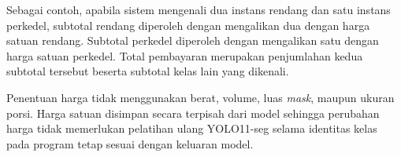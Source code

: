 Sebagai contoh, apabila sistem mengenali dua instans rendang dan satu instans perkedel, subtotal rendang diperoleh dengan mengalikan dua dengan harga satuan rendang. Subtotal perkedel diperoleh dengan mengalikan satu dengan harga satuan perkedel. Total pembayaran merupakan penjumlahan kedua subtotal tersebut beserta subtotal kelas lain yang dikenali.

Penentuan harga tidak menggunakan berat, volume, luas \textit{mask}, maupun ukuran porsi. Harga satuan disimpan secara terpisah dari model sehingga perubahan harga tidak memerlukan pelatihan ulang YOLO11-seg selama identitas kelas pada program tetap sesuai dengan keluaran model.
